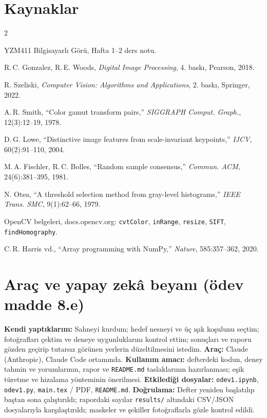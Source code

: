 \documentclass[9pt,a4paper]{extarticle}
\newcommand{\kod}[1]{\texttt{\small #1}}
\begin{document}
\section*{Kaynaklar}
{\fontsize{7.6}{9}\selectfont
\begin{multicols}{2}
\begin{enumerate}[label={[\arabic*]},leftmargin=5mm,itemsep=0.1ex,topsep=0pt,parsep=0pt]
\item YZM411 Bilgisayarlı Görü, Hafta 1--2 ders notu.
\item R.\,C. Gonzalez, R.\,E. Woods, \textit{Digital Image Processing}, 4. baskı, Pearson, 2018.
\item R. Szeliski, \textit{Computer Vision: Algorithms and Applications}, 2. baskı, Springer, 2022.
\item A.\,R. Smith, ``Color gamut transform pairs,'' \textit{SIGGRAPH Comput. Graph.}, 12(3):12--19, 1978.
\item D.\,G. Lowe, ``Distinctive image features from scale-invariant keypoints,'' \textit{IJCV}, 60(2):91--110, 2004.
\item M.\,A. Fischler, R.\,C. Bolles, ``Random sample consensus,'' \textit{Commun. ACM}, 24(6):381--395, 1981.
\item N. Otsu, ``A threshold selection method from gray-level histograms,'' \textit{IEEE Trans. SMC}, 9(1):62--66, 1979.
\item OpenCV belgeleri, docs.opencv.org: \kod{cvtColor}, \kod{inRange}, \kod{resize}, \kod{SIFT}, \kod{findHomography}.
\item C.\,R. Harris vd., ``Array programming with NumPy,'' \textit{Nature}, 585:357--362, 2020.
\end{enumerate}
\end{multicols}}

\section*{Araç ve yapay zekâ beyanı (ödev madde 8.e)}
\textbf{Kendi yaptıklarım:} Sahneyi kurdum; hedef nesneyi ve üç ışık koşulunu seçtim; fotoğrafları çektim ve deneye uygunluklarını kontrol ettim; sonuçları ve raporu gözden geçirip tutarsız görünen yerlerin düzeltilmesini istedim.
\textbf{Araç:} Claude (Anthropic), Claude Code ortamında. \textbf{Kullanım amacı:} defterdeki kodun, deney tahmin ve yorumlarının, rapor ve \kod{README.md} taslaklarının hazırlanması; eşik türetme ve hizalama yönteminin önerilmesi. \textbf{Etkilediği dosyalar:} \kod{odev1.ipynb}, \kod{odev1.py}, \kod{main.tex} / PDF, \kod{README.md}.
\textbf{Doğrulama:} Defter yeniden başlatılıp baştan sona çalıştırıldı; rapordaki sayılar \kod{results/} altındaki CSV/JSON dosyalarıyla karşılaştırıldı; maskeler ve şekiller fotoğraflarla gözle kontrol edildi.
\end{document}
